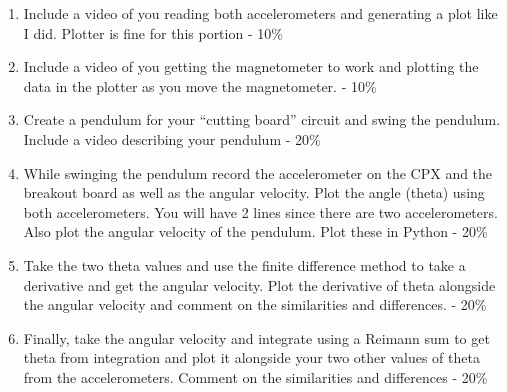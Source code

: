 \begin{enumerate}[itemsep=-5pt]
\item Include a video of you reading both accelerometers and generating a plot like I did. Plotter is fine for this portion - 10\%
\item Include a video of you getting the magnetometer to work and plotting the data in the plotter as you move the magnetometer. - 10\%
\item Create a pendulum for your “cutting board” circuit and swing the pendulum. Include a video describing your pendulum - 20\%
\item While swinging the pendulum record the accelerometer on the CPX and the breakout board as well as the angular velocity. Plot the angle (theta) using both accelerometers. You will have 2 lines since there are two accelerometers. Also plot the angular velocity of the pendulum. Plot these in Python - 20\%
\item Take the two theta values and use the finite difference method to take a derivative and get the angular velocity. Plot the derivative of theta alongside the angular velocity and comment on the similarities and differences. - 20\%
\item Finally, take the angular velocity and integrate using a Reimann sum to get theta from integration and plot it alongside your two other values of theta from the accelerometers. Comment on the similarities and differences - 20\%
\end{enumerate}